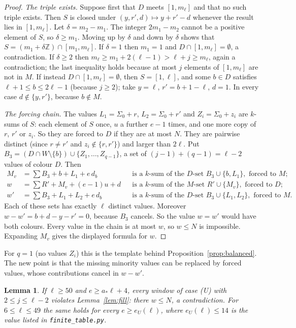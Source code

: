 \documentclass[11pt]{amsart}
\newtheorem{lemma}[theorem]{Lemma}
\theoremstyle{definition}
\begin{document}
\begin{proof}
\emph{The triple exists.} Suppose first that $D$ meets $[1,m_\ell]$ and that no such triple exists. Then $S$ is closed under $(y,r',d)\mapsto y+r'-d$ whenever the result lies in $[1,m_\ell]$. Let $\delta=m_2-m_1$. The integer $2m_1-m_2$ cannot be a positive element of $S$, so $\delta\ge m_1$. Moving up by $\delta$ and down by $\delta$ shows that $S=(m_1+\delta\mathbb Z)\cap[m_1,m_\ell]$. If $\delta=1$ then $m_1=1$ and $D\cap[1,m_\ell]=\emptyset$, a contradiction. If $\delta\ge2$ then $m_\ell\ge m_1+2(\ell-1)>\ell+j\ge m_\ell$, again a contradiction; the last inequality holds because at most $j$ elements of $[1,m_\ell]$ are not in $M$. If instead $D\cap[1,m_\ell]=\emptyset$, then $S=[1,\ell]$, and some $b\in D$ satisfies $\ell+1\le b\le2\ell-1$ (because $j\ge2$); take $y=\ell$, $r'=b+1-\ell$, $d=1$. In every case $d\notin\{y,r'\}$, because $b\notin M$.

\emph{The forcing chain.} The values $L_1=\Sigma_0+r$, $L_2=\Sigma_0+r'$ and $Z_i=\Sigma_0+z_i$ are $k$-sums of $S$: each element of $S$ once, $u$ a further $e-1$ times, and one more copy of $r$, $r'$ or $z_i$. So they are forced to $D$ if they are at most $N$. They are pairwise distinct (since $r\ne r'$ and $z_i\notin\{r,r'\}$) and larger than $2\ell$. Put $B_3=(D\cap W\setminus\{b\})\cup\{Z_1,\dots,Z_{q-1}\}$, a set of $(j-1)+(q-1)=\ell-2$ values of colour $D$. Then
\begin{align*}
M_v&=\textstyle\sum B_3+b+L_1+e\,d_b&&\text{is a $k$-sum of the $D$-set }B_3\cup\{b,L_1\},\text{ forced to }M;\\
w&=\textstyle\sum R'+M_v+(e-1)u+d&&\text{is a $k$-sum of the $M$-set }R'\cup\{M_v\},\text{ forced to }D;\\
w'&=\textstyle\sum B_3+L_1+L_2+e\,d_b&&\text{is a $k$-sum of the $D$-set }B_3\cup\{L_1,L_2\},\text{ forced to }M.
\end{align*}
Each of these sets has exactly $\ell$ distinct values. Moreover $w-w'=b+d-y-r'=0$, because $B_3$ cancels. So the value $w=w'$ would have both colours. Every value in the chain is at most $w$, so $w\le N$ is impossible. Expanding $M_v$ gives the displayed formula for $w$.
\end{proof}

\noindent For $q=1$ (no values $Z_i$) this is the template behind Proposition~\ref{prop:balanced}. The new point is that the missing minority values can be replaced by forced values, whose contributions cancel in $w-w'$.

\begin{lemma}\label{lem:fillbound}
If $\ell\ge50$ and $e\ge a_*\ell+4$, every window of case (U) with $2\le j\le\ell-2$ violates Lemma~\ref{lem:fill}: there $w\le N$, a contradiction. For $6\le\ell\le49$ the same holds for every $e\ge e_U(\ell)$, where $e_U(\ell)\le14$ is the value listed in \texttt{finite\_table.py}.
\end{lemma}
\end{document}
